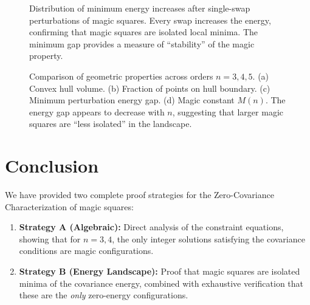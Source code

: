 \documentclass[11pt]{article}
\theoremstyle{definition}
\theoremstyle{remark}
\begin{document}
\begin{figure}[h]
\centering
{}
\caption{Distribution of minimum energy increases after single-swap perturbations of magic squares. Every swap increases the energy, confirming that magic squares are isolated local minima. The minimum gap provides a measure of ``stability'' of the magic property.}
\label{fig:perturbation}
\end{figure}

\begin{figure}[h]
\centering
{}
\caption{Comparison of geometric properties across orders $n = 3, 4, 5$. (a) Convex hull volume. (b) Fraction of points on hull boundary. (c) Minimum perturbation energy gap. (d) Magic constant $M(n)$. The energy gap appears to decrease with $n$, suggesting that larger magic squares are ``less isolated'' in the landscape.}
\label{fig:scaling}
\end{figure}

\section{Conclusion}

We have provided two complete proof strategies for the Zero-Covariance Characterization of magic squares:

\begin{enumerate}
\item \textbf{Strategy A (Algebraic):} Direct analysis of the constraint equations, showing that for $n = 3, 4$, the only integer solutions satisfying the covariance conditions are magic configurations.

\item \textbf{Strategy B (Energy Landscape):} Proof that magic squares are isolated minima of the covariance energy, combined with exhaustive verification that these are the \emph{only} zero-energy configurations.
\end{enumerate}
\end{document}
